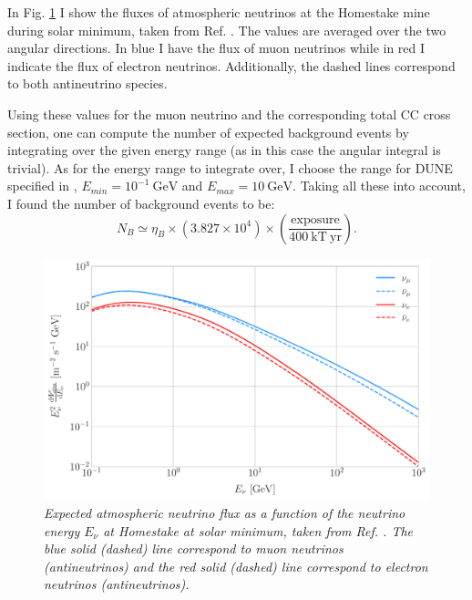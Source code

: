 In Fig. \ref{fig:homestake_fluxes} I show the fluxes of atmospheric neutrinos at the Homestake mine during solar minimum, taken from Ref. \cite{Honda2015}. The values are averaged over the two angular directions. In blue I have the flux of muon neutrinos while in red I indicate the flux of electron neutrinos. Additionally, the dashed lines correspond to both antineutrino species.

Using these values for the muon neutrino and the corresponding total CC cross section, one can compute the number of expected background events by integrating over the given energy range (as in this case the angular integral is trivial). As for the energy range to integrate over, I choose the range for DUNE specified in \cite{DUNE2020TDR2}, $E_{min} = 10^{-1} \ \mathrm{GeV}$ and $E_{max} = 10 \ \mathrm{GeV}$. Taking all these into account, I found the number of background events to be:
\begin{equation}\label{4.4}
	N_{B} \simeq  \eta_{B} \times \left(3.827 \times 10^{4}\right) \times \left(\frac{\mathrm{exposure}}{400 \ \mathrm{kT \ yr}}\right).
\end{equation}

\begin{figure}[t]
	\centering
	\includegraphics[width=0.9\linewidth]{Images/DM_Analysis/homestake_fluxes}
	\caption{\textit{Expected atmospheric neutrino flux as a function of the neutrino energy $E_{\nu}$ at Homestake at solar minimum, taken from Ref. \cite{Honda2015}. The blue solid (dashed) line correspond to muon neutrinos (antineutrinos) and the red solid (dashed) line correspond to electron neutrinos (antineutrinos).}}
	\label{fig:homestake_fluxes}
\end{figure}

